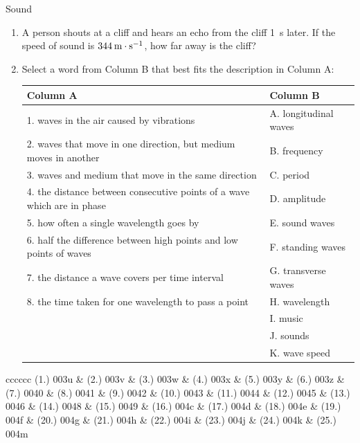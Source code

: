 \begin{eocexercises}{Sound}
\begin{enumerate}[noitemsep, label=\textbf{\arabic*}. ]
\label{m38783*uid44}\item A person shouts at a cliff and hears an echo from the cliff 1~s later. If the speed of sound is $344\phantom{\rule{2pt}{0ex}}\text{m}\ensuremath{\cdot}\text{s}{}^{-1}$, how far away is the cliff?\newline
\label{m38783*uid37}\item Select a word from Column B that best fits the description in Column A:
          \begin{center}
\begin{tabular}{ll}
\textbf{Column A} & \textbf{Column B} \\ \hline
1. waves in the air caused by vibrations & A. longitudinal waves \\
2. waves that move in one direction, but medium moves in another & B. frequency \\
3. waves and medium that move in the same direction & C. period \\
4. the distance between consecutive points of a wave which are in phase & D. amplitude \\
5. how often a single wavelength goes by & E. sound waves \\
6. half the difference between high points and low points of waves & F. standing waves \\
7. the distance a wave covers per time interval & G. transverse waves \\
8. the time taken for one wavelength to pass a point & H. wavelength \\
& I. music \\
& J. sounds \\
& K. wave speed \\
\end{tabular}
\end{center}
\end{enumerate}
  \label{m38800**end}
  \label{9b5d72dd5f0585e544578ab90a9956a8**end}
\par \practiceinfo
 \par \begin{tabular}[h]{cccccc}
 (1.) 003u  &  (2.) 003v  &  (3.) 003w  &  (4.) 003x  &  (5.) 003y  &  (6.) 003z  &  (7.) 0040  &  (8.) 0041  &  (9.) 0042  &  (10.) 0043  &  (11.) 0044  &  (12.) 0045  &  (13.) 0046  &  %
  (14.) 0048  &  (15.) 0049  &  
(16.) 004c  &  
(17.) 004d  &  (18.) 004e  &  (19.) 004f  &  (20.) 004g  &  (21.) 004h  &  (22.) 004i  &  (23.) 004j  & (24.) 004k & (25.) 004m  \end{tabular}

\end{eocexercises}
